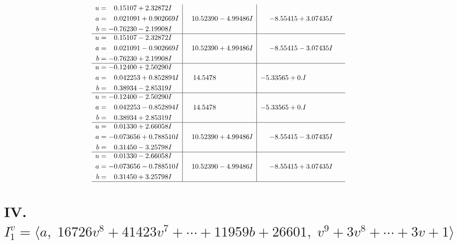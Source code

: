 \documentclass[1p]{elsarticle_modified}
\theoremstyle{definition}
\begin{document}
$$\begin{array}{c|c|c}
\begin{aligned}
u &= \phantom{-}0.15107 + 2.32872 I \\
a &= \phantom{-}0.021091 + 0.902669 I \\
b &= -0.76230 - 2.19908 I\end{aligned}
 & \phantom{-}10.52390 - 4.99486 I & -8.55415 + 3.07435 I \\ \hline\begin{aligned}
u &= \phantom{-}0.15107 - 2.32872 I \\
a &= \phantom{-}0.021091 - 0.902669 I \\
b &= -0.76230 + 2.19908 I\end{aligned}
 & \phantom{-}10.52390 + 4.99486 I & -8.55415 - 3.07435 I \\ \hline\begin{aligned}
u &= -0.12400 + 2.50290 I \\
a &= \phantom{-}0.042253 + 0.852894 I \\
b &= \phantom{-}0.38934 - 2.85319 I\end{aligned}
 & \phantom{-}14.5478\phantom{ +0.000000I} & -5.33565 + 0. I\phantom{ +0.000000I} \\ \hline\begin{aligned}
u &= -0.12400 - 2.50290 I \\
a &= \phantom{-}0.042253 - 0.852894 I \\
b &= \phantom{-}0.38934 + 2.85319 I\end{aligned}
 & \phantom{-}14.5478\phantom{ +0.000000I} & -5.33565 + 0. I\phantom{ +0.000000I} \\ \hline\begin{aligned}
u &= \phantom{-}0.01330 + 2.66058 I \\
a &= -0.073656 + 0.788510 I \\
b &= \phantom{-}0.31450 - 3.25798 I\end{aligned}
 & \phantom{-}10.52390 + 4.99486 I & -8.55415 - 3.07435 I \\ \hline\begin{aligned}
u &= \phantom{-}0.01330 - 2.66058 I \\
a &= -0.073656 - 0.788510 I \\
b &= \phantom{-}0.31450 + 3.25798 I\end{aligned}
 & \phantom{-}10.52390 - 4.99486 I & -8.55415 + 3.07435 I\\
 \hline 
 \end{array}$$\newpage\newpage\renewcommand{\arraystretch}{1}
\centering \section*{IV. $I^v_{1}= \langle a,\;16726 v^8+41423 v^7+\cdots+11959 b+26601,\;v^9+3 v^8+\cdots+3 v+1 \rangle$}
\end{document}
